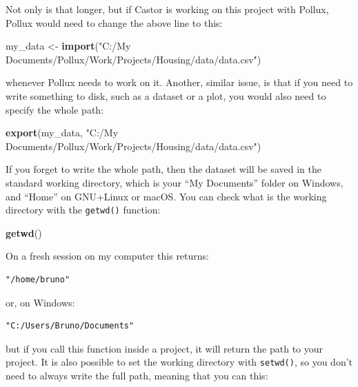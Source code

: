 \documentclass[]{gitbook}
\newenvironment{Shaded}{\begin{snugshade}}{\end{snugshade}}
\newcommand{\KeywordTok}[1]{\textcolor[rgb]{0.13,0.29,0.53}{\textbf{#1}}}
\newcommand{\NormalTok}[1]{#1}
\newcommand{\StringTok}[1]{\textcolor[rgb]{0.31,0.60,0.02}{#1}}
\begin{document}
Not only is that longer, but if Castor is working on this project with Pollux, Pollux would need
to change the above line to this:

\begin{Shaded}
\begin{Highlighting}[]
\NormalTok{my_data <-}\StringTok{ }\KeywordTok{import}\NormalTok{(}\StringTok{"C:/My Documents/Pollux/Work/Projects/Housing/data/data.csv"}\NormalTok{)}
\end{Highlighting}
\end{Shaded}

whenever Pollux needs to work on it. Another, similar issue, is that if you need to write something
to disk, such as a dataset or a plot, you would also need to specify the whole path:

\begin{Shaded}
\begin{Highlighting}[]
\KeywordTok{export}\NormalTok{(my_data, }\StringTok{"C:/My Documents/Pollux/Work/Projects/Housing/data/data.csv"}\NormalTok{)}
\end{Highlighting}
\end{Shaded}

If you forget to write the whole path, then the dataset will be saved in the standard working
directory, which is your ``My Documents'' folder on Windows, and ``Home'' on GNU+Linux or macOS. You
can check what is the working directory with the \texttt{getwd()} function:

\begin{Shaded}
\begin{Highlighting}[]
\KeywordTok{getwd}\NormalTok{()}
\end{Highlighting}
\end{Shaded}

On a fresh session on my computer this returns:

\begin{verbatim}
"/home/bruno"
\end{verbatim}

or, on Windows:

\begin{verbatim}
"C:/Users/Bruno/Documents"
\end{verbatim}

but if you call this function inside a project, it will return the path to your project. It is also
possible to set the working directory with \texttt{setwd()}, so you don't need to always write the full
path, meaning that you can this:
\end{document}
